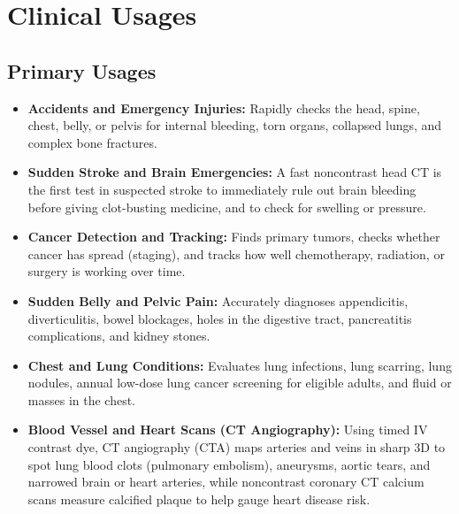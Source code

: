 \section{Clinical Usages}

\subsection{Primary Usages}
\begin{itemize}
    \item \textbf{Accidents and Emergency Injuries:} Rapidly checks the head, spine, chest, belly, or pelvis for internal bleeding, torn organs, collapsed lungs, and complex bone fractures.
    \item \textbf{Sudden Stroke and Brain Emergencies:} A fast noncontrast head CT is the first test in suspected stroke to immediately rule out brain bleeding before giving clot-busting medicine, and to check for swelling or pressure.
    \item \textbf{Cancer Detection and Tracking:} Finds primary tumors, checks whether cancer has spread (staging), and tracks how well chemotherapy, radiation, or surgery is working over time.
    \item \textbf{Sudden Belly and Pelvic Pain:} Accurately diagnoses appendicitis, diverticulitis, bowel blockages, holes in the digestive tract, pancreatitis complications, and kidney stones.
    \item \textbf{Chest and Lung Conditions:} Evaluates lung infections, lung scarring, lung nodules, annual low-dose lung cancer screening for eligible adults, and fluid or masses in the chest.
    \item \textbf{Blood Vessel and Heart Scans (CT Angiography):} Using timed IV contrast dye, CT angiography (CTA) maps arteries and veins in sharp 3D to spot lung blood clots (pulmonary embolism), aneurysms, aortic tears, and narrowed brain or heart arteries, while noncontrast coronary CT calcium scans measure calcified plaque to help gauge heart disease risk.
\end{itemize}

